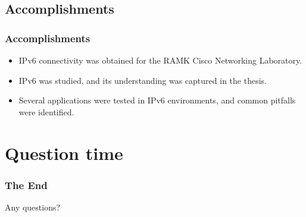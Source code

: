 \documentclass{beamer}
\begin{document}
\subsection{Accomplishments}

\begin{frame}
  \frametitle{Accomplishments}

\begin{itemize}
  \item IPv6 connectivity was obtained for the RAMK Cisco Networking Laboratory.\\
  \item IPv6 was studied, and its understanding was captured in the thesis.\\
  \item Several applications were tested in IPv6 environments, and common pitfalls were identified.
\end{itemize}
\end{frame}

\section{Question time}

\begin{frame}
  \frametitle{The End}

\begin{center}
  Any questions?
\end{center}
\end{frame}
\end{document}
